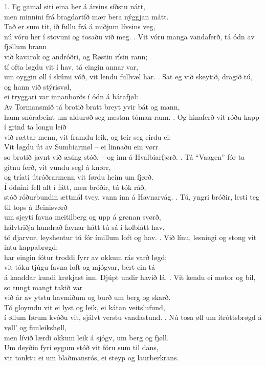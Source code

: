 1. Eg gamal siti eina her á ársins síðstu nátt, \\
men minnini frá bragdartíð mær bera nýggjan mátt. \\
Tað er sum tit, ið fullu frá á miðjum lívsins veg, \\
nú vóru her í stovuni og tosaðu við meg. 
. Vit vóru manga vandaferð, tá ódn av fjøllum brann \\
við kavarok og andróðri, og Røstin rísin rann;\\ 
tí ofta løgdu vit í hav, tá eingin annar var,\\
um oyggin øll í skúmi vóð, vit lendu fullvæl har.
. Sat eg við skeytið, dragið tú, og hann við stýrisvøl, \\
ei tryggari var innanborðs í ódn á bátafjøl: \\
Av Tormansmið tá brotið bratt breyt yvir bát og mann, \\
hann snórabeint um aldurøð seg næstan tóman rann.
. Og hinaferð vit róðu kapp í grind ta longu leið \\
við rættar menn, vit framdu leik, og teir seg eirdu ei: \\
Vit løgdu út av Sumbiarmøl – ei linnaðu ein vørr\\
so brotið javnt við æsing stóð, – og inn á Hvalbiarfjørð.
. Tá “Vaagen” fór ta gitnu ferð, vit vundu segl á knørr, \\
og tríati útróðrarmenn vit førdu heim um fjørð. \\
Í ódnini fell alt í fátt, men bróðir, tú tók ráð, \\
stóð róðurbundin ættmál tvey, vann inn á Havnarvág.
. Tú, yngri bróðir, lesti teg til tops á Beinisvørð \\
um sjeyti favna meitilberg og upp á grønan svørð, \\
hálvtriðja hundrað favnar hátt tú sá í kolblátt hav, \\
tó djarvur, leyshentur tú fór ímillum loft og hav. 
. Við línu, lesningi og stong vit intu kappabrøgd: \\
har eingin fótur troddi fyrr av okkum rás varð løgd; \\
vit tóku tjúgu favna loft og mjógvar, bert ein tá \\
á knaddar kundi krøkjast inn. Djúpt undir havið lá.
. Vit kendu ei motor og bil, so tungt mangt takið var \\
við ár av ytstu havmiðum og burð um berg og skarð. \\
Tó gloymdu vit ei lyst og leik, ei kátan veitslufund, \\
í øllum førum kvóðu vit, sjálvt verstu vandastund.
. Nú tosa øll um ítróttsbrøgd á vøll’ og fimleikshøll, \\
men lívið lærdi okkum leik á sjógv, um berg og fjøll. \\
Um deyðin fyri eygum stóð vit fóru sum til dans, \\
vit tonktu ei um blaðmansrós, ei steyp og laurberkrans.
